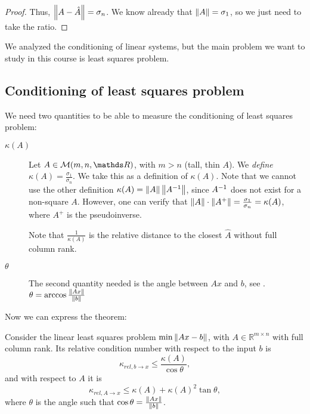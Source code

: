 \documentclass[computational_mathematics.tex]{subfiles}
\begin{document}
\begin{proof}
Thus, $\left\lVert A - \hat{A}\right\rVert = \sigma_n$. We know already that $\left\lVert A\right\rVert=\sigma_1$, so we just need to take the ratio.
\end{proof}


We analyzed the conditioning of linear systems, but the main problem we want to study in this course is least squares problem.

\subsection{Conditioning of least squares problem}

We need two quantities to be able to measure the conditioning of least squares problem:

\begin{description}
  \item[ $\kappa(A)$]
Let $A \in \mathcal{M}(m, n, \R)$, with $m > n$ (tall, thin $A$). We \emph{define} $\kappa(A) = \frac{\sigma_1}{\sigma_n}$. We take this as a definition of $\kappa(A)$. Note that we cannot use the other definition $\kappa(A)=\left\lVert A\right\rVert\left\lVert{A}^{-1}\right\rVert$, since ${A}^{-1}$ does not exist for a non-square $A$. However, one can verify that $\left\lVert A\right\rVert \cdot \left\lVert A^{+}\right\rVert = \frac{\sigma_1}{\sigma_n}=\kappa(A)$, where $A^+$ is the pseudoinverse.

\begin{obs}
  Note that $\frac{1}{\kappa(A)}$ is the relative distance to the closest $\hat{A}$ without full column rank.
\end{obs}

  \item[ $\theta$]
    The second quantity needed is the angle between $Ax$ and $b$, see .
$\theta = \arccos \frac{\left\lVert Ax\right\rVert}{\left\lVert b\right\rVert}$
\end{description}

Now we can express the theorem:

\begin{theorem}
Consider the linear least squares problem $\min \left\lVert Ax-b\right\rVert$, with $A\in\mathbb{R}^{m\times n}$ with full column rank. Its relative condition number with respect to the input $b$ is
\[
\kappa_{rel, b \to x} \leq \frac{\kappa(A)}{\cos\theta},
\]
and with respect to $A$ it is
\[
  \kappa_{rel, A \to x} \leq \kappa(A) + {\kappa(A)}^2 \tan \theta,
\]
where $\theta$ is the angle such that $\cos \theta = \frac{\left\lVert Ax\right\rVert}{\left\lVert b\right\rVert}$.
\end{theorem}
\end{document}
